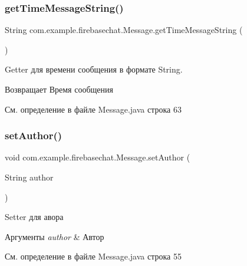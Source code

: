 \subsubsection{\texorpdfstring{get\+Time\+Message\+String()}{getTimeMessageString()}}
{\footnotesize\ttfamily String com.\+example.\+firebasechat.\+Message.\+get\+Time\+Message\+String (\begin{DoxyParamCaption}{ }\end{DoxyParamCaption})}



Getter для времени сообщения в формате String. 

\begin{DoxyReturn}{Возвращает}
Время сообщения 
\end{DoxyReturn}


См. определение в файле Message.\+java строка 63

\mbox{\label{classcom_1_1example_1_1firebasechat_1_1_message_a8fd45837a4a4bd7682909d5c8d4d11b6}} 
\subsubsection{\texorpdfstring{set\+Author()}{setAuthor()}}
{\footnotesize\ttfamily void com.\+example.\+firebasechat.\+Message.\+set\+Author (\begin{DoxyParamCaption}\item[{String}]{author }\end{DoxyParamCaption})}



Setter для авора 


\begin{DoxyParams}{Аргументы}
{\em author} & Автор \\
\hline
\end{DoxyParams}


См. определение в файле Message.\+java строка 55

\mbox{\label{classcom_1_1example_1_1firebasechat_1_1_message_abb5288c3d6bd3e961f9ee1f7680abb65}} 
